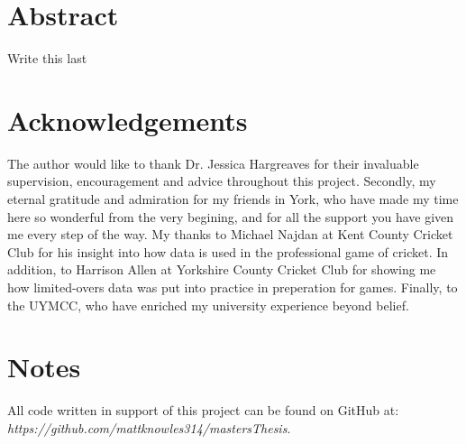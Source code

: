 \documentclass[11pt]{report}
\begin{document}


\section*{Abstract}
Write this last

\section*{Acknowledgements}
The author would like to thank Dr. Jessica Hargreaves for their invaluable supervision, encouragement and advice throughout this project. Secondly, my eternal gratitude and admiration for my friends in York, who have made my time here so wonderful from the very begining, and for all the support you have given me every step of the way. 
My thanks to Michael Najdan at Kent County Cricket Club for his insight into how data is used in the professional game of cricket. In addition, to Harrison Allen at Yorkshire County Cricket Club for showing me how limited-overs data was put into practice in preperation for games.
Finally, to the UYMCC, who have enriched my university experience beyond belief. 


\section*{Notes}
All code written in support of this project can be found on GitHub at: \\
\textit{https://github.com/mattknowles314/mastersThesis}.

\setcounter{tocdepth}{0}
\tableofcontents

\setcounter{tocdepth}{1}
\listoffigures
















\appendix




{}

\end{document}
